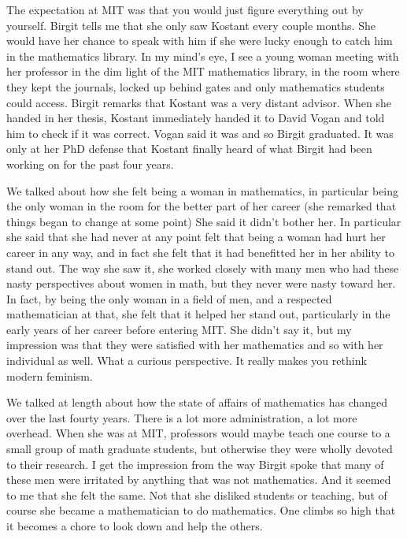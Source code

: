 \documentclass[12pt]{article}
\begin{document}
\hfill

The expectation at MIT was that you would just figure everything out by yourself. Birgit tells me that she only saw Kostant every couple months. She would have her chance to speak with him if 
she were lucky enough to catch him in the mathematics library. In my mind's eye, I see a young woman meeting with her professor in the dim light of the MIT mathematics library, in the room 
where they kept the journals, locked up behind gates and only mathematics students could access. Birgit remarks that Kostant was a very distant advisor. When she handed in her thesis, 
Kostant immediately handed it to David Vogan and told him to check if it was correct. Vogan said it was and so Birgit graduated. It was only at her PhD defense that Kostant finally heard of 
what Birgit had been working on for the past four years. 

\hfill

We talked about how she felt being a woman in mathematics, in particular being the only woman in the room for the better part of her career (she remarked that things began to change at some point)
She said it didn't bother her. In particular she said that she had never at any point felt that being a woman had hurt her career in any way, and in fact she felt that
it had benefitted her in her ability to stand out. The way she saw it, she worked closely with many men who had these nasty perspectives about women in math, but they never were nasty toward her.
In fact, by being the only woman in a field of men, and a respected mathematician at that, she felt that it helped her stand out, particularly in the early years of her career before entering MIT.
She didn't say it, but my impression was that they were satisfied with her mathematics and so with her individual as well. What a curious perspective. It really makes you rethink
modern feminism.

\hfill

We talked at length about how the state of affairs of mathematics has changed over the last fourty years. There is a lot more administration, a lot more overhead.
When she was at MIT, professors would maybe teach one course to a small group of math graduate students, but otherwise they were wholly devoted to their research.
I get the impression from the way Birgit spoke that many of these men were irritated by anything
that was not mathematics. And it seemed to me that she felt the same. Not that she disliked students or teaching, but of course she became a mathematician to 
do mathematics. One climbs so high that it becomes a chore to look down and help the others.
\end{document}
